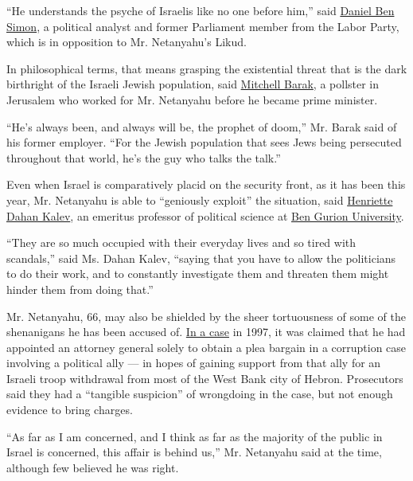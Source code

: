 ``He understands the psyche of Israelis like no one before him,'' said
\href{https://www.knesset.gov.il/mk/eng/mk_eng.asp?mk_individual_id_t=836}{Daniel
Ben}
\href{https://www.knesset.gov.il/mk/eng/mk_eng.asp?mk_individual_id_t=836}{Simon},
a political analyst and former Parliament member from the Labor Party,
which is in opposition to Mr. Netanyahu's Likud.

In philosophical terms, that means grasping the existential threat that
is the dark birthright of the Israeli Jewish population, said
\href{http://www.keevoon.com/about.html}{Mitchell Barak}, a pollster in
Jerusalem who worked for Mr. Netanyahu before he became prime minister.

``He's always been, and always will be, the prophet of doom,'' Mr. Barak
said of his former employer. ``For the Jewish population that sees Jews
being persecuted throughout that world, he's the guy who talks the
talk.''

Even when Israel is comparatively placid on the security front, as it
has been this year, Mr. Netanyahu is able to ``geniously exploit'' the
situation, said
\href{http://bgu.academia.edu/\%D7\%94\%D7\%A0\%D7\%A8\%D7\%99\%D7\%99\%D7\%98\%D7\%93\%D7\%94\%D7\%90\%D7\%9F\%D7\%9B\%D7\%9C\%D7\%91}{Henriette
Dahan Kalev}, an emeritus professor of political science at
\href{http://in.bgu.ac.il/en/Pages/default.aspx}{Ben Gurion University}.

``They are so much occupied with their everyday lives and so tired with
scandals,'' said Ms. Dahan Kalev, ``saying that you have to allow the
politicians to do their work, and to constantly investigate them and
threaten them might hinder them from doing that.''

Mr. Netanyahu, 66, may also be shielded by the sheer tortuousness of
some of the shenanigans he has been accused of.
\href{http://www.nytimes.com/1997/04/21/world/netanyahu-avoids-criminal-charges-in-scandal-inquiry.html}{In
a case} in 1997, it was claimed that he had appointed an attorney
general solely to obtain a plea bargain in a corruption case involving a
political ally --- in hopes of gaining support from that ally for an
Israeli troop withdrawal from most of the West Bank city of Hebron.
Prosecutors said they had a ``tangible suspicion'' of wrongdoing in the
case, but not enough evidence to bring charges.

``As far as I am concerned, and I think as far as the majority of the
public in Israel is concerned, this affair is behind us,'' Mr. Netanyahu
said at the time, although few believed he was right.

